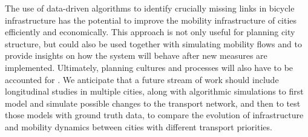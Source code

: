 The use of data-driven algorithms to identify crucially missing links in bicycle infrastructure has the potential to improve the mobility infrastructure of cities efficiently and economically. This approach is not only useful for planning city structure, but could also be used together with simulating mobility flows and to provide insights on how the system will behave after new measures are implemented. Ultimately, planning cultures and processes will also have to be accounted for \cite{zhao2018bicycle}. We anticipate that a future stream of work should include longitudinal studies \cite{carstensen2015spatio} in multiple cities, along with algorithmic simulations to first model and simulate possible changes to the transport network, and then to test those models with ground truth data, to compare the evolution of infrastructure and mobility dynamics between cities with different transport priorities.